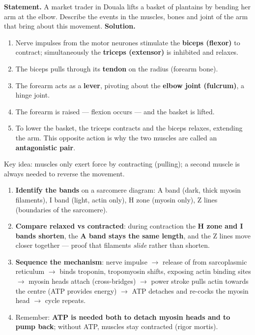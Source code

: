 \documentclass[11pt]{article}
\begin{document}
\begin{exoresolu}
\textbf{Statement.} A market trader in Douala lifts a basket of plantains by bending her arm at the elbow. Describe the events in the muscles, bones and joint of the arm that bring about this movement.
\tcblower
\textbf{Solution.}
\begin{enumerate}
\item Nerve impulses from the motor neurones stimulate the \textbf{biceps (flexor)} to contract; simultaneously the \textbf{triceps (extensor)} is inhibited and relaxes.
\item The biceps pulls through its \textbf{tendon} on the radius (forearm bone).
\item The forearm acts as a \textbf{lever}, pivoting about the \textbf{elbow joint (fulcrum)}, a hinge joint.
\item The forearm is raised --- flexion occurs --- and the basket is lifted.
\item To lower the basket, the triceps contracts and the biceps relaxes, extending the arm. This opposite action is why the two muscles are called an \textbf{antagonistic pair}.
\end{enumerate}
Key idea: muscles only exert force by contracting (pulling); a second muscle is always needed to reverse the movement.
\end{exoresolu}

\begin{methode}
\begin{enumerate}
\item \textbf{Identify the bands} on a sarcomere diagram: A band (dark, thick myosin filaments), I band (light, actin only), H zone (myosin only), Z lines (boundaries of the sarcomere).
\item \textbf{Compare relaxed vs contracted}: during contraction the \textbf{H zone and I bands shorten}, the \textbf{A band stays the same length}, and the Z lines move closer together --- proof that filaments \emph{slide} rather than shorten.
\item \textbf{Sequence the mechanism}: nerve impulse $\rightarrow$ release of  from sarcoplasmic reticulum $\rightarrow$  binds troponin, tropomyosin shifts, exposing actin binding sites $\rightarrow$ myosin heads attach (cross-bridges) $\rightarrow$ power stroke pulls actin towards the centre (ATP provides energy) $\rightarrow$ ATP detaches and re-cocks the myosin head $\rightarrow$ cycle repeats.
\item Remember: \textbf{ATP is needed both to detach myosin heads and to pump  back}; without ATP, muscles stay contracted (rigor mortis).
\end{enumerate}
\end{methode}
\end{document}
